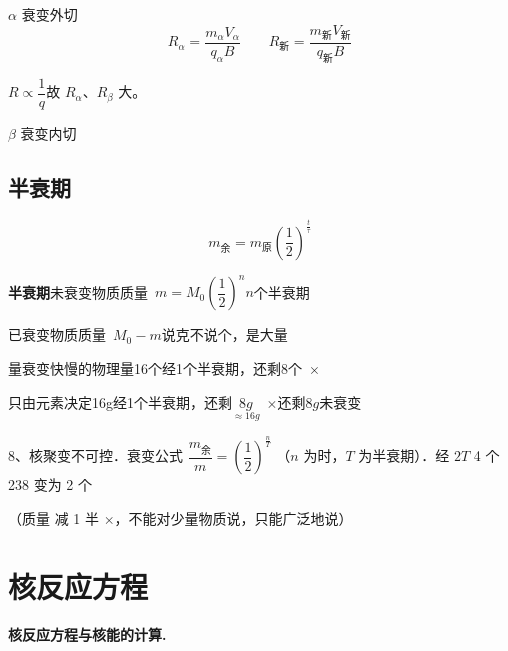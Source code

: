 \noindent $\alpha$ 衰变\quad 外切
\[ R_\alpha=\frac{m_\alpha V_\alpha}{q_\alpha B}\qquad R_{\text{新}}=\frac{m_{\text{新}}V_{\text{新}}}{q_{\text{新}}B} \]
\begin{keybox}
$R\propto\dfrac1q$\quad 故 $R_\alpha$、$R_\beta$ 大。
\end{keybox}
\noindent $\beta$ 衰变\quad 内切

\subsection{半衰期}
\[
m_{\text{余}}=m_{\text{原}}\left(\frac12\right)^{\frac{t}{\tau}}
\] %

\textbf{半衰期}\quad 未衰变物质质量\ $m=M_0\left(\dfrac{1}{2}\right)^n$\qquad $n$个半衰期

\hspace{4.5em}已衰变物质质量\ $M_0-m$\qquad\qquad 说克不说个，是大量

量衰变快慢的物理量\qquad 16个经1个半衰期，还剩8个\ $\times$

只由元素决定\qquad 16g经1个半衰期，还剩$\underset{\approx16\unit{g}}{8\unit{g}}$\ $\times$\quad 还剩$8\unit{g}$未衰变

8、核聚变不可控．\quad 衰变公式 $\dfrac{m_{\text{余}}}{m}=\left(\dfrac12\right)^{\frac nT}$%
\quad（$n$ 为时，$T$ 为半衰期）．经 $2T$ 4 个 238 变为 2 个%

\quad {}

（质量  减 1 半 $\times$，不能对少量物质说，只能广泛地说）


\section{核反应方程}
\textbf{核反应方程与核能的计算.}

